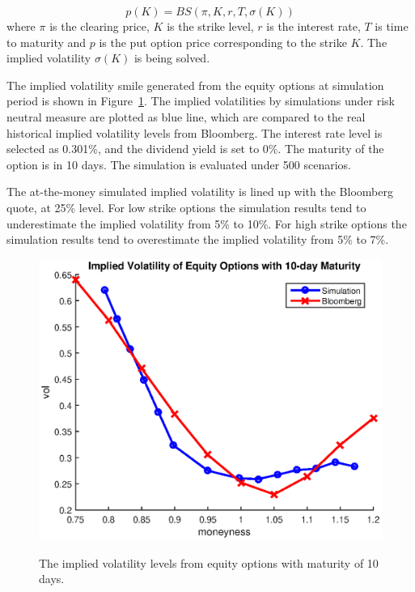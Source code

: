 \documentclass{article}
\begin{document}
$$
p(K) = BS(\pi,K,r,T,\sigma(K))
$$
where $\pi$ is the clearing price, $K$ is the strike level, $r$ is the interest rate, $T$ is time to maturity and $p$ is the put option price corresponding to the strike $K$.
The implied volatility $\sigma(K)$ is being solved.

The implied volatility smile generated from the equity options at simulation period is shown in Figure~\ref{fig::Put_Option_Vols}.
The implied volatilities by simulations under risk neutral measure are plotted as blue line, which are compared to the real historical implied volatility levels from Bloomberg. The interest rate level is selected as 0.301\%, and the dividend yield is set to 0\%. The maturity of the option is in 10 days. The simulation is evaluated under 500 scenarios.

The at-the-money simulated implied volatility is lined up with the Bloomberg quote, at 25\% level. For low strike options the simulation results tend to underestimate the implied volatility from 5\% to 10\%. For high strike options the simulation results tend to overestimate the implied volatility from 5\% to 7\%.

\begin{center}
\begin{figure}
  \centering
  \includegraphics[scale = 0.5]{implied_vol.eps}\\
  \caption{The implied volatility levels from equity options with maturity of 10 days.}\label{fig::Put_Option_Vols}
\end{figure}
\end{center}
\end{document}
